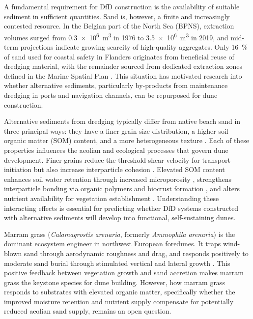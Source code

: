 \documentclass[authoryear,preprint,review,12pt]{elsarticle}
\begin{document}
A fundamental requirement for DfD construction is the availability of suitable sediment in sufficient quantities. Sand is, however, a finite and increasingly contested resource. In the Belgian part of the North Sea (BPNS), extraction volumes surged from \SI{0.3e6}{\cubic\metre} in 1976 to \SI{3.5e6}{\cubic\metre} in 2019, and mid-term projections indicate growing scarcity of high-quality aggregates. Only \SI{16}{\percent} of sand used for coastal safety in Flanders originates from beneficial reuse of dredging material, with the remainder sourced from dedicated extraction zones defined in the Marine Spatial Plan \citep{speybroeck2006beach}. This situation has motivated research into whether alternative sediments, particularly by-products from maintenance dredging in ports and navigation channels, can be repurposed for dune construction.

Alternative sediments from dredging typically differ from native beach sand in three principal ways: they have a finer grain size distribution, a higher soil organic matter (SOM) content, and a more heterogeneous texture \citep{vandeneede2014assessing}. Each of these properties influences the aeolian and ecological processes that govern dune development. Finer grains reduce the threshold shear velocity for transport initiation but also increase interparticle cohesion \citep{shao2000simple}. Elevated SOM content enhances soil water retention through increased microporosity \citep{saxton2006soil}, strengthens interparticle bonding via organic polymers and biocrust formation \citep{zobeck2013soil}, and alters nutrient availability for vegetation establishment \citep{vanderputten1993plant}. Understanding these interacting effects is essential for predicting whether DfD systems constructed with alternative sediments will develop into functional, self-sustaining dunes.

Marram grass (\textit{Calamagrostis arenaria}, formerly \textit{Ammophila arenaria}) is the dominant ecosystem engineer in northwest European foredunes. It traps wind-blown sand through aerodynamic roughness and drag, and responds positively to moderate sand burial through stimulated vertical and lateral growth \citep{huiskes1979ammophila, disraeli1984effect, keijsers2016adaptation, reijers2021review}. This positive feedback between vegetation growth and sand accretion makes marram grass the keystone species for dune building. However, how marram grass responds to substrates with elevated organic matter, specifically whether the improved moisture retention and nutrient supply compensate for potentially reduced aeolian sand supply, remains an open question.
\end{document}
